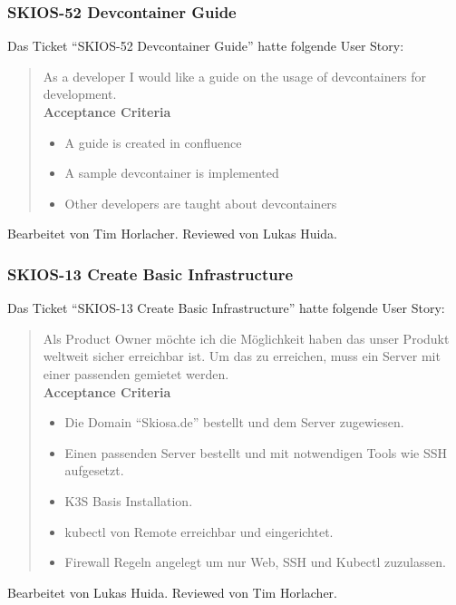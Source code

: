 \subsubsection{SKIOS-52 Devcontainer Guide}
Das Ticket \enquote{SKIOS-52 Devcontainer Guide} hatte folgende User Story:
\begin{quotation}
    As a developer I would like a guide on the usage of devcontainers for development. \\
    \textbf{Acceptance Criteria}
    \begin{itemize}
        \item A guide is created in confluence
        \item A sample devcontainer is implemented
        \item Other developers are taught about devcontainers 
    \end{itemize}
\end{quotation}
Bearbeitet von Tim Horlacher.
Reviewed von Lukas Huida.

\subsubsection{SKIOS-13 Create Basic Infrastructure}
Das Ticket \enquote{SKIOS-13 Create Basic Infrastructure} hatte folgende User Story:
\begin{quotation}
    Als Product Owner möchte ich die Möglichkeit haben das unser Produkt weltweit sicher erreichbar ist. Um das zu erreichen, muss ein Server mit einer passenden gemietet werden. \\
    \textbf{Acceptance Criteria}
    \begin{itemize}
        \item Die Domain \enquote{Skiosa.de} bestellt und dem Server zugewiesen.
        \item Einen passenden Server bestellt und mit notwendigen Tools wie SSH aufgesetzt.
        \item K3S Basis Installation.
        \item kubectl von Remote erreichbar und eingerichtet.
        \item Firewall Regeln angelegt um nur Web, SSH und Kubectl zuzulassen.
    \end{itemize} 
\end{quotation}
Bearbeitet von Lukas Huida.
Reviewed von Tim Horlacher.


